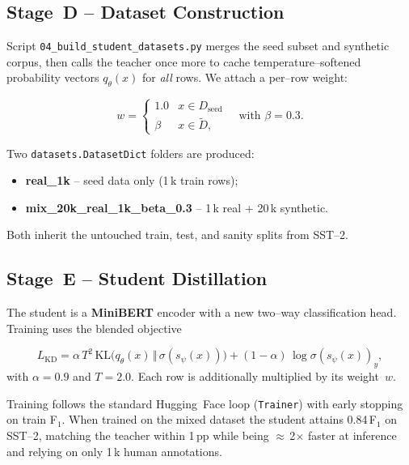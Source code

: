 \documentclass[11pt]{article}
\begin{document}
\subsection{Stage~D -- Dataset Construction}
\label{sec:dataset}

Script \texttt{04\_build\_student\_datasets.py} merges the seed
subset and synthetic corpus, then calls the teacher once more to cache
temperature--softened probability vectors $q_{\theta}(x)$ for \emph{all}
rows.  We attach a per--row weight:

\[
  w =
  \begin{cases}
    1.0 & x\in D_{\text{seed}} \\
    \beta & x\in\tilde{D},
  \end{cases}
  \quad\text{with }\beta=0.3.
\]

Two \texttt{datasets.DatasetDict} folders are produced:

\begin{itemize}
  \item \textbf{real\_1k} -- seed data only (1\,k train rows);
  \item \textbf{mix\_20k\_real\_1k\_beta\_0.3} -- 1\,k real + 20\,k synthetic.
\end{itemize}

Both inherit the untouched train, test, and sanity splits from SST--2.

\subsection{Stage~E -- Student Distillation}
\label{sec:student}

The student is a \textbf{MiniBERT} encoder with a new
two--way classification head.  Training uses the blended objective

\[
  L_{\text{KD}} = \alpha\,T^{2}\,
  \mathrm{KL}\bigl(q_{\theta}(x)\,\Vert\,\sigma(s_{\psi}(x))\bigr)
  +(1-\alpha)\,
  \log\sigma(s_{\psi}(x))_{y},
\]
with $\alpha=0.9$ and $T=2.0$.  Each row is additionally multiplied by
its weight~$w$.

Training follows the standard Hugging~Face loop (\texttt{Trainer}) with
early stopping on train F$_1$.  When trained on the mixed dataset the
student attains 0.84\,F$_1$ on SST--2, matching the teacher within
1\,pp while being $\approx$\,2$\times$ faster at inference and relying
on only 1\,k human annotations.
\end{document}
